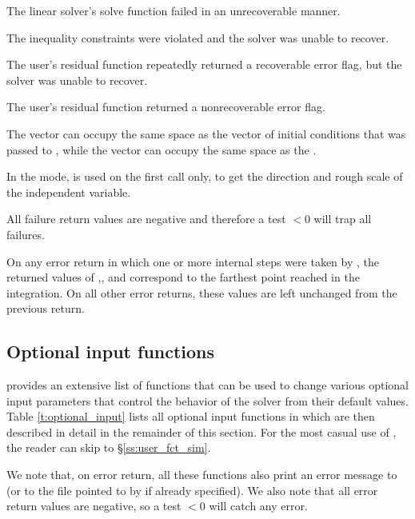 {{\begin{args}
  \item[\Id{IDA\_LSOLVE\_FAIL}] 
    The linear solver's solve function failed in an unrecoverable manner.
  \item[\Id{IDA\_CONSTR\_FAIL}]
    The inequality constraints were violated and the solver was unable
    to recover.
  \item[\Id{IDA\_REP\_RES\_ERR}]
    The user's residual function repeatedly returned a recoverable error
    flag, but the solver was unable to recover.
  \item[\Id{IDA\_RES\_FAIL}]
    The user's residual function returned a nonrecoverable error flag.
  \end{args} 
}
{
  The vector  can occupy the same space as the  vector of 
  initial conditions that was passed to , while the
  vector  can occupy the same space as the .

  In the  mode,  is used on the first call only, 
  to get the direction and rough scale of the independent variable.

  All failure return values are negative and therefore a test  $< 0$
  will trap all  failures.

  On any error return in which one or more internal steps were taken by
  , the returned values of ,, and 
  correspond to the farthest point reached in the integration.
  On all other error returns, these values are left unchanged from the
  previous  return.
}


\subsection{Optional input functions}\label{ss:optional_input}

{\ida} provides an extensive list of functions that can be used to change
various optional input parameters that control the
behavior of the {\ida} solver from their default values. 
Table \ref{t:optional_input} lists all optional input functions in {\ida} which 
are then described in detail in the remainder of this section.
For the most casual use of {\ida}, the reader can skip to \S\ref{ss:user_fct_sim}.

We note that, on error return, all these functions also print an error message to 
 (or to the file pointed to by  if already specified).
We also note that all error return values are negative, 
so a test  $<0$ will catch any error.

}
